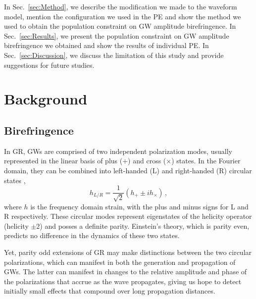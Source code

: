 \documentclass[aps,prd,twocolumn,superscriptaddress,preprintnumbers,floatfix,nofootinbib]{revtex4-2}
\begin{document}
In Sec.~\ref{sec:Method}, we describe the modification we made to the waveform model, mention the configuration we used in the \ac{PE} and show the method we used to obtain the population constraint on \ac{GW} amplitude birefringence.
In Sec.~\ref{sec:Results}, we present the population constraint on \ac{GW} amplitude birefringence we obtained and show the results of individual \ac{PE}.
In Sec.~\ref{sec:Discussion}, we discuss the limitation of this study and provide suggestions for future studies.

\section{Background}
\label{sec:Background}

\subsection{Birefringence}
\label{sec:waveform}

In \ac{GR}, \acp{GW} are comprised of two independent polarization modes, usually represented in the linear basis of plus ($+$) and cross ($\times$) states.
In the Fourier domain, they can be combined into left-handed (L) and right-handed (R) circular states \cite{Isi:2022mbx},
\begin{equation}
    h_{{L/R}} = \frac{1}{\sqrt{2}}\left(h_+ \pm i h_\times\right)\,,
\end{equation}
where $h$ is the frequency domain strain, with the plus and minus signs for L and R respectively.
These circular modes represent eigenstates of the helicity operator (helicity $\pm2$) and posses a definite parity.
Einstein's theory, which is parity even, predicts no difference in the dynamics of these two states.

Yet, parity odd extensions of \ac{GR} may make distinctions between the two circular polarizations, which can manifest in both the generation and propagation of \acp{GW}.
The latter can manifest in changes to the relative amplitude and phase of the polarizations that accrue as the wave propagates, giving us hope to detect initially small effects that compound over long propagation distances.
\end{document}
